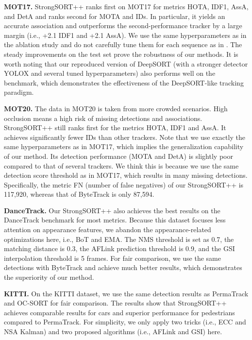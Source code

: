 \documentclass[lettersize,journal]{IEEEtran}
\begin{document}
\noindent \textbf{MOT17.} 
StrongSORT++ ranks first on MOT17 for metrics HOTA, IDF1, AssA, and DetA and ranks second for MOTA and IDs.
In particular, it yields an accurate association and outperforms the second-performance tracker by a large margin (i.e., +2.1 IDF1 and +2.1 AssA).
We use the same hyperparameters as in the ablation study and do not carefully tune them for each sequence as in \cite{zhang2022bytetrack}.
The steady improvements on the test set prove the robustness of our methods.
It is worth noting that our reproduced version of DeepSORT (with a stronger detector YOLOX and several tuned hyperparameters) also performs well on the benchmark, 
which demonstrates the effectiveness of the DeepSORT-like tracking paradigm.

\noindent \textbf{MOT20.} 
The data in MOT20 is taken from more crowded scenarios.
High occlusion means a high risk of missing detections and associations.
StrongSORT++ still ranks first for the metrics HOTA, IDF1 and AssA.
It achieves significantly fewer IDs than other trackers.
Note that we use exactly the same hyperparameters as in MOT17, which implies the generalization capability of our method.
Its detection performance (MOTA and DetA) is slightly poor compared to that of several trackers.
We think this is because we use the same detection score threshold as in MOT17, which results in many missing detections.
Specifically, the metric FN (number of false negatives) of our StrongSORT++ is 117,920, whereas that of ByteTrack \cite{zhang2022bytetrack} is only 87,594.

\noindent \textbf{DanceTrack.}
Our StrongSORT++ also achieves the best results on the DanceTrack benchmark for most metrics.
Because this dataset focuses less attention on appearance features, 
we abandon the appearance-related optimizations here, i.e., BoT and EMA.
The NMS threshold is set as 0.7, the matching distance is 0.3, the AFLink prediction threshold is 0.9,
and the GSI interpolation threshold is 5 frames.
For fair comparison, we use the same detections with ByteTrack \cite{zhang2022bytetrack}
and achieve much better results, which demonstrates the superiority of our method.

\noindent \textbf{KITTI.}
On the KITTI dataset, we use the same detection results as PermaTrack \cite{tokmakov2021learning} and OC-SORT \cite{cao2022observation} for fair comparison.
The results show that StrongSORT++ achieves comparable results for cars and superior performance for pedestrians compared to PermaTrack.
For simplicity, we only apply two tricks (i.e., ECC and NSA Kalman) and  two proposed algorithms (i.e., AFLink and GSI) here.
\end{document}
